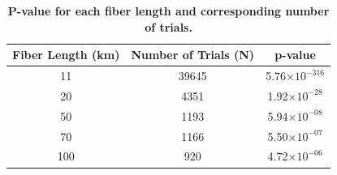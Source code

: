 \documentclass[aps,reprint,showpacs,superscriptaddress]{revtex4-2}
\begin{document}
{	\begin{table}[b]
	\centering
	\caption{\textbf{P-value for each fiber length and corresponding number of trials.}}
	\label{table:pvalue}
	\begin{tabular}{|c|c|c|}
		\hline
		\textbf{Fiber Length (km)} & \textbf{Number of Trials (N)} & \textbf{p-value} \\
		\hline
		11 & 39645 & 5.76$\times10^{-316}$ \\
		20 & 4351  & 1.92$\times10^{-28}$  \\
		50 & 1193  & 5.94$\times10^{-08}$  \\
		70 & 1166  & 5.50$\times10^{-07}$  \\
		100 & 920  & 4.72$\times10^{-06}$  \\
		\hline
	\end{tabular}
\end{table}
}
\end{document}
